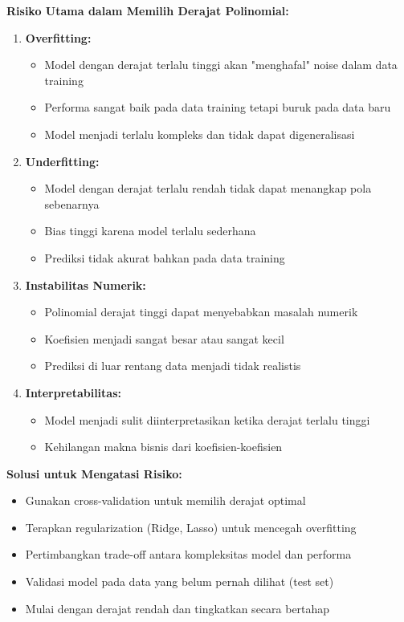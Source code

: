 \documentclass[a4paper]{article}
\begin{document}
\begin{enumerate}[itemsep=1em,leftmargin=*]
  \textbf{Risiko Utama dalam Memilih Derajat Polinomial:}
  
  \begin{enumerate}
    \item \textbf{Overfitting:}
    \begin{itemize}
      \item Model dengan derajat terlalu tinggi akan "menghafal" noise dalam data training
      \item Performa sangat baik pada data training tetapi buruk pada data baru
      \item Model menjadi terlalu kompleks dan tidak dapat digeneralisasi
    \end{itemize}
    
    \item \textbf{Underfitting:}
    \begin{itemize}
      \item Model dengan derajat terlalu rendah tidak dapat menangkap pola sebenarnya
      \item Bias tinggi karena model terlalu sederhana
      \item Prediksi tidak akurat bahkan pada data training
    \end{itemize}
    
    \item \textbf{Instabilitas Numerik:}
    \begin{itemize}
      \item Polinomial derajat tinggi dapat menyebabkan masalah numerik
      \item Koefisien menjadi sangat besar atau sangat kecil
      \item Prediksi di luar rentang data menjadi tidak realistis
    \end{itemize}
    
    \item \textbf{Interpretabilitas:}
    \begin{itemize}
      \item Model menjadi sulit diinterpretasikan ketika derajat terlalu tinggi
      \item Kehilangan makna bisnis dari koefisien-koefisien
    \end{itemize}
  \end{enumerate}
  
  \textbf{Solusi untuk Mengatasi Risiko:}
  \begin{itemize}
    \item Gunakan cross-validation untuk memilih derajat optimal
    \item Terapkan regularization (Ridge, Lasso) untuk mencegah overfitting
    \item Pertimbangkan trade-off antara kompleksitas model dan performa
    \item Validasi model pada data yang belum pernah dilihat (test set)
    \item Mulai dengan derajat rendah dan tingkatkan secara bertahap
  \end{itemize}

\end{enumerate}
\end{document}

